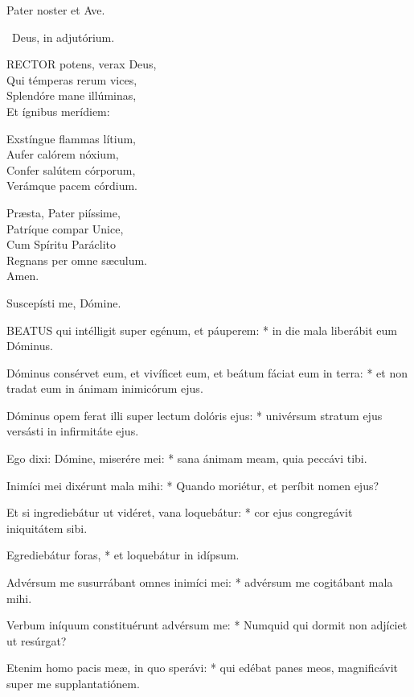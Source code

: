 

Pater noster et Ave.

\V\ Deus, in adjutórium.


\lettrine[lines=2]{R}{ECTOR} potens, verax Deus,\\
Qui témperas rerum vices,\\
Splendóre mane illúminas,\\
Et ígnibus merídiem:

Exstíngue flammas lítium,\\
Aufer calórem nóxium,\\
Confer salútem córporum,\\
Verámque pacem córdium.

Præsta, Pater piíssime,\\
Patríque compar Unice,\\
Cum Spíritu Paráclito\\
Regnans per omne sæculum.\\
Amen.

 Suscepísti me, Dómine.


\lettrine[lines=2]{B}{EATUS} qui intélligit super egénum, et páuperem: * in die mala liberábit eum Dóminus.

Dóminus consérvet eum, et vivíficet eum, et beátum fáciat eum in terra: * et non tradat eum in ánimam inimicórum ejus.

Dóminus opem ferat illi super lectum dolóris ejus: * univérsum stratum ejus versásti in infirmitáte ejus.

Ego dixi: Dómine, miserére mei: * sana ánimam meam, quia peccávi tibi.

Inimíci mei dixérunt mala mihi: * Quando moriétur, et períbit nomen ejus?

Et si ingrediebátur ut vidéret, vana loquebátur: * cor ejus congregávit iniquitátem sibi.

Egrediebátur foras, * et loquebátur in idípsum.

Advérsum me susurrábant omnes inimíci mei: * advérsum me cogitábant mala mihi.

Verbum iníquum constituérunt advérsum me: * Numquid qui dormit non adjíciet ut resúrgat?

Etenim homo pacis meæ, in quo sperávi: * qui edébat panes meos, magnificávit super me supplantatiónem.

